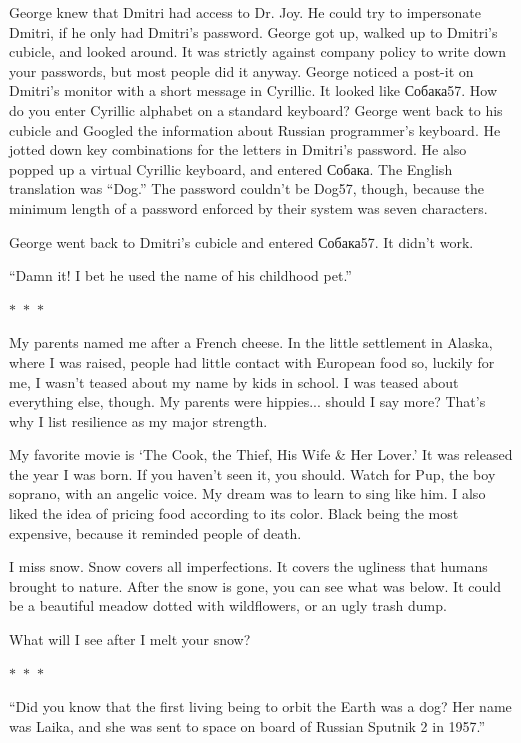 \documentclass{memoir}
\newcommand{\starbreak}{%
\begin{center}
  $\ast$~$\ast$~$\ast$
\end{center}
}
\begin{document}
George knew that Dmitri had access to Dr. Joy. He could try to impersonate Dmitri, if he only had Dmitri's password. George got up, walked up to Dmitri's cubicle, and looked around. It was strictly against company policy to write down your passwords, but most people did it anyway. George noticed a post-it on Dmitri's monitor with a short message in Cyrillic. It looked like \foreignlanguage{russian}{Собака57}. How do you enter Cyrillic alphabet on a standard keyboard? George went back to his cubicle and Googled the information about Russian programmer's keyboard. He jotted down key combinations for the letters in Dmitri's password. He also popped up a virtual Cyrillic keyboard, and entered \foreignlanguage{russian}{Собака}. The English translation was ``Dog.'' The password couldn't be Dog57, though, because the minimum length of a password enforced by their system was seven characters. 

George went back to Dmitri's cubicle and entered \foreignlanguage{russian}{Собака57}. It didn't work. 

``Damn it! I bet he used the name of his childhood pet.''

\starbreak

My parents named me after a French cheese. In the little settlement in Alaska, where I was raised, people had little contact with European food so, luckily for me, I wasn't teased about my name by kids in school. I was teased about everything else, though. My parents were hippies... should I say more? That's why I list resilience as my major strength.

My favorite movie is `The Cook, the Thief, His Wife \& Her Lover.' It was released the year I was born. If you haven't seen it, you should. Watch for Pup, the boy soprano, with an angelic voice. My dream was to learn to sing like him. I also liked the idea of pricing food according to its color. Black being the most expensive, because it reminded people of death.

I miss snow. Snow covers all imperfections. It covers the ugliness that humans brought to nature. After the snow is gone, you can see what was below. It could be a beautiful meadow dotted with wildflowers, or an ugly trash dump. 

What will I see after I melt your snow?

\starbreak

``Did you know that the first living being to orbit the Earth was a dog? Her name was Laika, and she was sent to space on board of Russian Sputnik 2 in 1957.''
\end{document}
